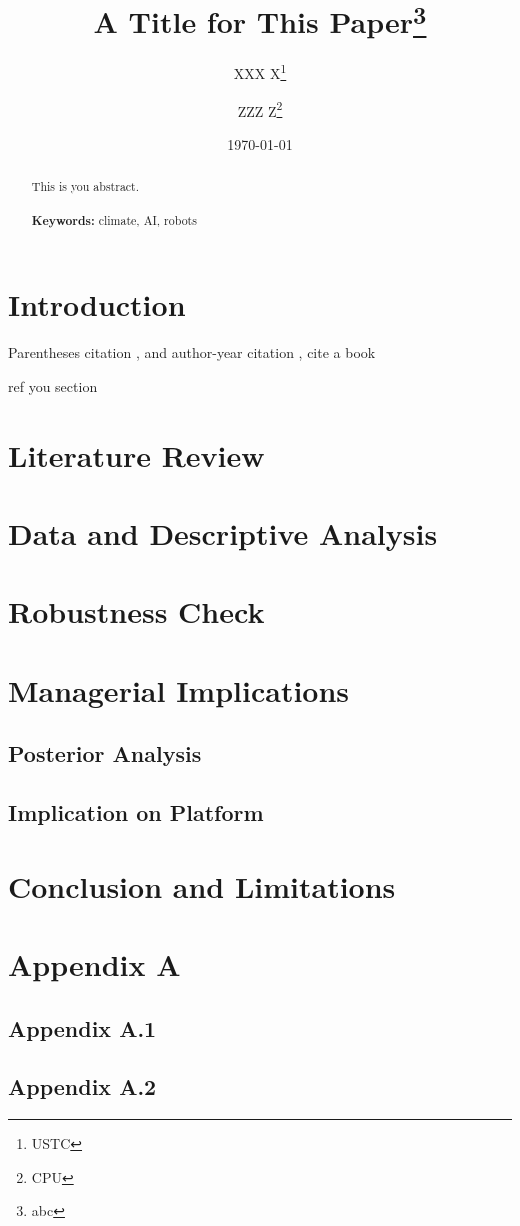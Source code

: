 \documentclass[a4paper, 12pt]{article}
\begin{document}
\begin{titlepage}
    \title{A Title for This Paper\thanks{abc}}
    \author{XXX X\thanks{USTC} \and ZZZ  Z\thanks{CPU}}
    \date{\today}
    \maketitle
    \begin{abstract}
        \noindent 
        This is you abstract.
        \\
        \vspace{0in}\\
        \noindent\textbf{Keywords:} climate, AI, robots\\
        \bigskip
    \end{abstract}
    \setcounter{page}{0}
    \thispagestyle{empty}
\end{titlepage}
\pagebreak \newpage
\doublespacing
\section{Introduction}\label{sec:intro}
Parentheses citation \citep{DunningHuchetteLubin2017,DunningHuchetteLubin2017}, and author-year citation \citet{DunningHuchetteLubin2017}, cite a book \citep[\S 2.1.1]{DunningHuchetteLubin2017}

ref you section 
\section{Literature Review}
\section{Data and Descriptive Analysis}
\section{Robustness Check}
\section{Managerial Implications}
\subsection{Posterior Analysis}
\subsection{Implication on Platform}
\section{Conclusion and Limitations}
\clearpage


\clearpage
\section*{Appendix A}
\subsection*{Appendix A.1}
\subsection*{Appendix A.2}
\end{document}
